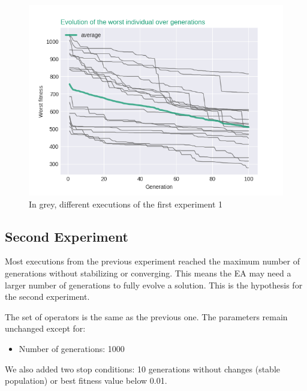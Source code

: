 \begin{figure}[H]
	\centering
	\includegraphics[scale=0.55]{exp1_worstIndv.png}
	\caption{In grey, different executions of the first experiment 1}\label{f:grahp1}
\end{figure}

\subsection{Second Experiment}

Most executions from the previous experiment reached the maximum number of generations without stabilizing or converging. This means the EA may need a larger number of generations to fully evolve a solution. This is the hypothesis for the second experiment.


The set of operators is the same as the previous one. The parameters remain unchanged except for:
\begin{itemize}
	\item Number of generations: 1000
\end{itemize}
We also added two stop conditions: 10 generations without changes (stable population) or best fitness value below 0.01.


